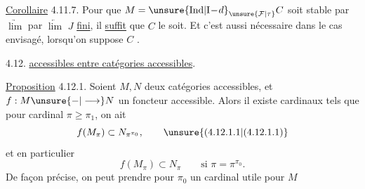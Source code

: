 \uline{Corollaire} 4.11.7. Pour que $M=\unsure{\mathrm{Ind}|\mathrm I\!-\!d}_{\unsure{\mathcal F|\tau}} C$
soit stable par $\underrightarrow{\lim}$  par $\underleftarrow{\lim}$ $J$ \uline{fini},
il \uline{suffit} que $C$ le soit. Et c'est
aussi nécessaire dans le cas envisagé,
lorsqu'on suppose $C$ .

4.12. \uline{ accessibles entre catégories
accessibles}. 

\uline{Proposition} 4.12.1. Soient $M,N$ deux
catégories accessibles, et $f:M\unsure{-|\longrightarrow}N$
un foncteur accessible. Alors
il existe  cardinaux  tels que
 pour  cardinal $\pi\geq\pi_1$, 
on ait
\[
 f(M_\pi)\subset N_{\pi^{\pi_0}}, \tag*{\unsure{(4.12.1.1|(4.12.1.1)}}
\]
et en particulier
\[
 f(M_\pi)\subset N_\pi\qquad\text{si }\pi=\pi^{\pi_0}. \tag*{(4.12.1.2)}
\]
De façon  précise, on peut prendre
pour $\pi_0$ un cardinal  utile pour $M$
